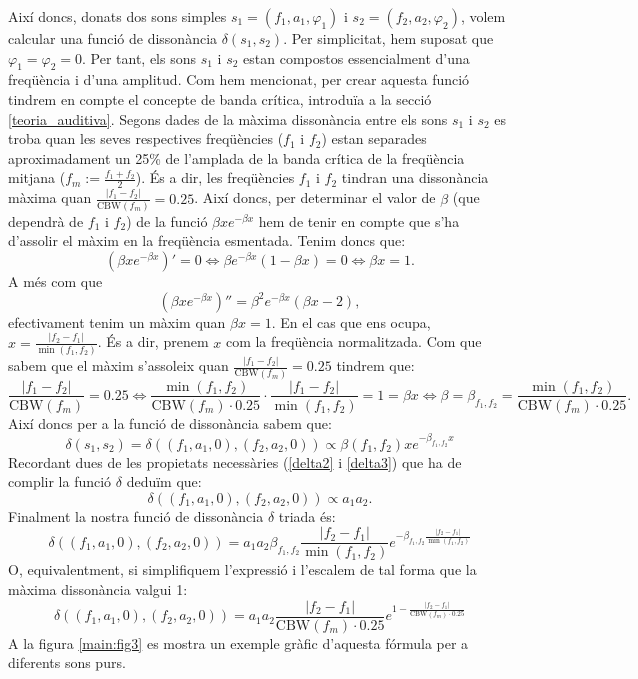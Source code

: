 \documentclass{article}
\theoremstyle{math}
\newcommand{\0}{\ensuremath{\vb{0}}}
\begin{document}
Així doncs, donats dos sons simples $s_1=(f_1,a_1,\varphi_1)$ i $s_2=(f_2,a_2,\varphi_2)$, volem calcular una funció de dissonància $\delta(s_1,s_2)$. Per simplicitat, hem suposat que $\varphi_1=\varphi_2=0$. Per tant, els sons $s_1$ i $s_2$ estan compostos essencialment d'una freqüència i d'una amplitud. Com hem mencionat, per crear aquesta funció tindrem en compte el concepte de banda crítica, introduïa a la secció \ref{teoria_auditiva}. Segons dades de \cite{zwicker} la màxima dissonància entre els sons $s_1$ i $s_2$ es troba quan les seves respectives freqüències ($f_1$ i $f_2$) estan separades aproximadament un 25\% de l'amplada de la banda crítica de la freqüència mitjana ($f_m:=\frac{f_1+f_2}{2}$). És a dir, les freqüències $f_1$ i $f_2$ tindran una dissonància màxima quan $\frac{|f_1-f_2|}{\text{CBW}(f_m)}=0.25$. Així doncs, per determinar el valor de $\beta$ (que dependrà de $f_1$ i $f_2$) de la funció $\beta xe^{-\beta x}$ hem de tenir en compte que s'ha d'assolir el màxim en la freqüència esmentada. Tenim doncs que:
$$\left(\beta xe^{-\beta x}\right)'=0\iff \beta e^{-\beta x}(1-\beta x)=0\iff\beta x=1.$$ A més com que $$\left(\beta xe^{-\beta x}\right)''=\beta^2e^{-\beta x}(\beta x-2),$$ efectivament tenim un màxim quan $\beta x=1$.
En el cas que ens ocupa, $x=\frac{|f_2-f_1|}{\min(f_1,f_2)}$. És a dir, prenem $x$ com la freqüència normalitzada. Com que sabem que el màxim s'assoleix quan $\frac{|f_1-f_2|}{\text{CBW}(f_m)}=0.25$ tindrem que:
$$\frac{|f_1-f_2|}{\text{CBW}(f_m)}=0.25\iff\frac{\min(f_1, f_2)}{\text{CBW}(f_m)\cdot 0.25}\cdot\frac{|f_1-f_2|}{\min(f_1, f_2)}=1=\beta x\iff\beta=\beta_{f_1,f_2}=\frac{\min(f_1, f_2)}{\text{CBW}(f_m)\cdot 0.25}.$$
Així doncs per a la funció de dissonància sabem que: $$\delta(s_1,s_2)=\delta((f_1,a_1,0),(f_2,a_2,0))\propto\beta(f_1,f_2)xe^{-\beta_{f_1,f_2}x}$$ Recordant dues de les propietats necessàries (\ref{delta2} i \ref{delta3}) que ha de complir la funció $\delta$ deduïm que: $$\delta((f_1,a_1,0),(f_2,a_2,0))\propto a_1a_2.$$ Finalment la nostra funció de dissonància $\delta$ triada és: $$\delta((f_1,a_1,0),(f_2,a_2,0))=a_1a_2\beta_{f_1,f_2}\frac{|f_2-f_1|}{\min(f_1,f_2)}e^{-\beta_{f_1,f_2}\frac{|f_2-f_1|}{\min(f_1,f_2)}}$$
O, equivalentment, si simplifiquem l'expressió i l'escalem de tal forma que la màxima dissonància valgui 1: 
\begin{equation}
    \delta((f_1,a_1,0),(f_2,a_2,0))=a_1a_2\frac{|f_2-f_1|}{\text{CBW}(f_m)\cdot 0.25}e^{1-\frac{|f_2-f_1|}{\text{CBW}(f_m)\cdot 0.25}}
    \label{for:dissonancia}
\end{equation}
A la figura \ref{main:fig3} es mostra un exemple gràfic d'aquesta fórmula per a diferents sons purs.
\begin{center}
    
    \label{main:fig3}
\end{center}
\end{document}
